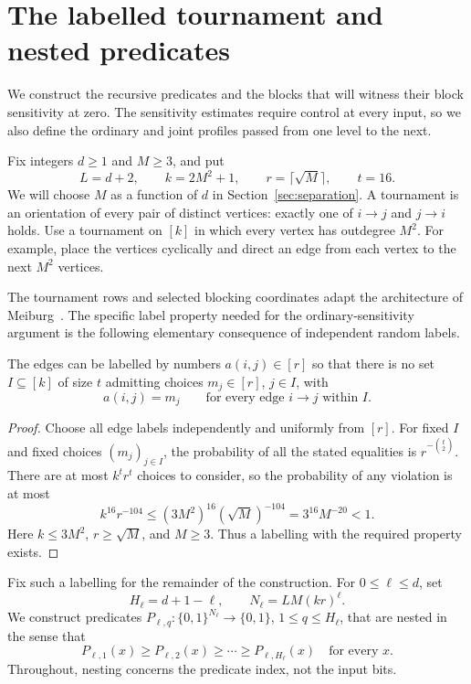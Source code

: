 \section{The labelled tournament and nested predicates}
\label{sec:construction}

We construct the recursive predicates and the blocks that will witness their
block sensitivity at zero. The sensitivity estimates require control at
every input, so we also define the ordinary and joint profiles passed from
one level to the next.

Fix integers \(d\ge1\) and \(M\ge3\), and put
\[
 L=d+2,\qquad k=2M^2+1,\qquad r=\lceil\sqrt M\rceil,
 \qquad t=16.
\]
We will choose \(M\) as a function of \(d\) in
Section~\ref{sec:separation}.
A tournament is an orientation of every pair of distinct vertices:
exactly one of \(i\to j\) and \(j\to i\) holds.
Use a tournament on \([k]\) in which every vertex has outdegree \(M^2\).
For example, place the vertices cyclically and direct an edge from
each vertex to the next \(M^2\) vertices.

The tournament rows and selected blocking coordinates adapt the architecture
of Meiburg~\cite[Sections~3.1 and~5.2--5.5]{Meiburg2026}.
The specific label property needed for the ordinary-sensitivity argument is
the following elementary consequence of independent random labels.

\begin{lemma}\label{lem:labelling}
The edges can be labelled by numbers \(a(i,j)\in[r]\) so that there is
no set \(I\subseteq[k]\) of size \(t\) admitting choices
\(m_j\in[r]\), \(j\in I\), with
\[
 a(i,j)=m_j \qquad\text{for every edge }i\to j\text{ within }I.
\]
\end{lemma}
\begin{proof}
Choose all edge labels independently and uniformly from \([r]\).
For fixed \(I\) and fixed choices \((m_j)_{j\in I}\), the probability
of all the stated equalities is \(r^{-\binom t2}\).
There are at most \(k^t r^t\) choices to consider, so the probability
of any violation is at most
\[
 k^{16}r^{-104}\le (3M^2)^{16}(\sqrt M)^{-104}
 =3^{16}M^{-20}<1.
\]
Here \(k\le3M^2\), \(r\ge\sqrt M\), and \(M\ge3\).
Thus a labelling with the required property exists.
\end{proof}

Fix such a labelling for the remainder of the construction.
For \(0\le\ell\le d\), set
\[
 H_\ell=d+1-\ell,\qquad N_\ell=LM(kr)^\ell.
\]
We construct predicates \(P_{\ell,q}:\{0,1\}^{N_\ell}\to\{0,1\}\),
\(1\le q\le H_\ell\), that are nested in the sense that
\[
 P_{\ell,1}(x)\ge P_{\ell,2}(x)\ge\cdots
 \ge P_{\ell,H_\ell}(x)\quad\text{for every }x.
\]
Throughout, nesting concerns the predicate index, not the input bits.

